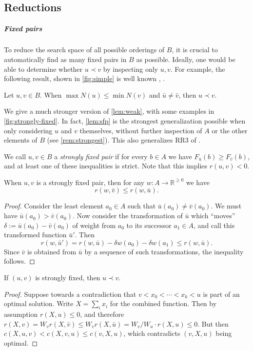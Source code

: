 \documentclass[a4paper,UKenglish,cleveref, autoref, thm-restate]{lipics-v2021}
\renewcommand{\b}{\prec}
\begin{document}
\subsection{Reductions}
\subparagraph{Fixed pairs}
To reduce the search space of all possible orderings of $B$, it is crucial to automatically
find as many fixed pairs in $B$ as possible. Ideally, one would be able to determine whether $u
\b v$ by inspecting only $u, v$. For example, the following result, shown in \cref{fig:simple} is well known \cite[Lemma
  1]{dujmovic_2004}, \cite[RR1]{dujmovic_2008}.

\begin{observation}\label{lem:weak}
  Let $u, v \in B$. When $\max N(u) \leq \min N(v)$ and $\bar u\neq \bar v$, then $u\b v$.
\end{observation}

We give a much stronger version of \cref{lem:weak}, with some examples in \cref{fig:strongly-fixed}. In fact, \cref{lem:sfp} is the strongest
generalization possible when only considering $u$ and $v$ themselves, without further inspection of
$A$ or the other elements of $B$ (see \cref{rem:strongest}). This also generalizes RR3 of
\cite{dujmovic_2008}.

\begin{definition}\label{def:sfp}
    We call $u, v \in B$ a \emph{strongly fixed pair} if for every $b \in A$ we have $F_{\bar
    u}(b) \geq F_{\bar v}(b)$, and at least one of these inequalities
    is strict. Note that this implies $r(u, v) < 0$.
\end{definition}
\begin{lemma}\label{lem:sfp} When $u, v$ is a strongly fixed pair,
    then for any $w: A\to \mathbb R^{\geq 0}$ we have 
    \[
        r(w, \bar v) \leq r(w, \bar u).
    \]
\end{lemma}
\begin{proof}
    Consider the least element $a_0 \in A$ such that $\bar u(a_0) \neq
    \bar v(a_0)$. We must have $\bar u(a_0) > \bar v(a_0)$. Now consider the transformation of
    $\bar u$ which ``moves'' $\delta := \bar u(a_0) - \bar v(a_0)$ of weight from $a_0$ to its
    successor $a_1 \in A$, and call this transformed function $\bar u'$. Then
    \[
        r(w, \bar u') = r(w, \bar u) - \delta w(a_0) - \delta w(a_1) \leq r(w, \bar u).
    \]
    Since $\bar v$ is obtained from $\bar u$ by a sequence of such transformations,
    the inequality follows.
\end{proof}
\begin{lemma}\label{lem:sfimplf}
    If $(u, v)$ is strongly fixed, then $u \b v$.
\end{lemma}
\begin{proof}
    Suppose towards a contradiction that $v < x_0 < \cdots < x_k < u$ is part of an optimal
    solution. Write $X = \sum_i x_i$ for the combined function. Then by assumption $r(X, u)
    \leq 0$, and therefore $r(X, v) = W_v r(X, \bar v) \leq W_v r(X, \bar u) = W_v / W_u \cdot
    r(X, u) \leq 0$. But then $c(X, u, v) < c(X, v, u)\leq c(v, X, u)$, which
    contradicts $(v,X,u)$ being optimal.
\end{proof}
\end{document}
